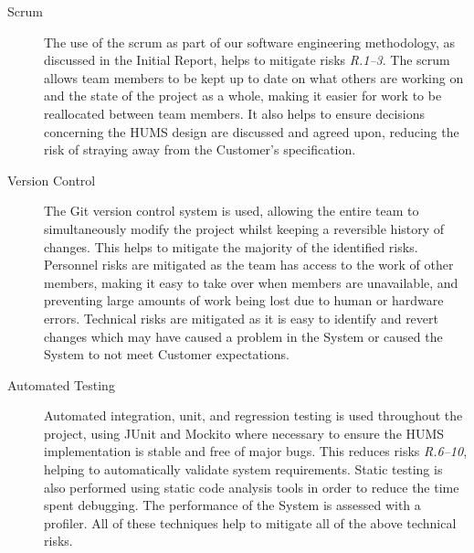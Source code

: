 \documentclass[10pt,a4paper]{article}
\begin{document}
\begin{description}
\item[Scrum]
The use of the scrum as part of our software engineering methodology, as discussed in the Initial Report, helps to mitigate risks \emph{R.1--3}. The scrum allows team members to be kept up to date on what others are working on and the state of the project as a whole, making it easier for work to be reallocated between team members. It also helps to ensure decisions concerning the HUMS design are discussed and agreed upon, reducing the risk of straying away from the Customer's specification.

\item[Version Control]
The Git version control system is used, allowing the entire team to simultaneously modify the project whilst keeping a reversible history of changes. This helps to mitigate the majority of the identified risks. Personnel risks are mitigated as the team has access to the work of other members, making it easy to take over when members are unavailable, and preventing large amounts of work being lost due to human or hardware errors. Technical risks are mitigated as it is easy to identify and revert changes which may have caused a problem in the System or caused the System to not meet Customer expectations.

\item[Automated Testing] 
Automated integration, unit, and regression testing is used throughout the project, using JUnit and Mockito where necessary to ensure the HUMS implementation is stable and free of major bugs. This reduces risks \emph{R.6--10}, helping to automatically validate system requirements. Static testing is also performed using static code analysis tools in order to reduce the time spent debugging. The performance of the System is assessed with a profiler. All of these techniques help to mitigate all of the above technical risks.
\end{description}

\end{document}
